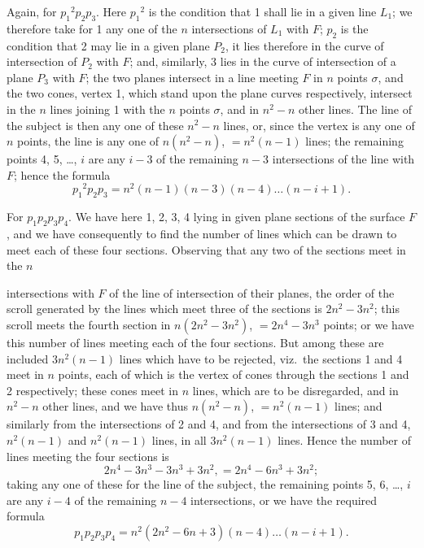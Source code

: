 \documentclass[11pt,a4paper,english]{article}
\theoremstyle{plain}
\begin{document}
Again, for ${p_1}^2p_2p_3$. Here ${p_1}^2$ is the condition that 1 shall lie in a given line $L_1$; we therefore take for 1 any one of the $n$ intersections of $L_1$ with $F$; $p_2$ is the condition that 2 may lie in a given plane $P_2$, it lies therefore in the curve of intersection of $P_2$ with $F$; and, similarly, 3 lies in the curve of intersection of a plane $P_3$ with $F$; the two planes intersect in a line meeting $F$ in $n$ points $\sigma$, and the two cones, vertex 1, which stand upon the plane curves respectively, intersect in the $n$ lines joining 1 with the $n$ points $\sigma$, and in $n^2 - n$ other lines. The line of the subject is then any one of these $n^2 - n$ lines, or, since the vertex is any one of $n$ points, the line is any one of $n(n^2 - n)$, $= n^2(n-1)$ lines; the remaining points 4, 5, \ldots, $i$ are any $i-3$ of the remaining $n-3$ intersections of the line with $F$; hence the formula
\[
{p_1}^2p_2p_3 = n^2(n-1)(n-3)(n-4)\ldots(n-i+1).
\]

For $p_1p_2p_3p_4$. We have here 1, 2, 3, 4 lying in given plane sections of the surface $F$, and we have consequently to find the number of lines which can be drawn to meet each of these four sections. Observing that any two of the sections meet in the $n$

\newpage
\noindent intersections with $F$ of the line of intersection of their planes, the order of the scroll generated by the lines which meet three of the sections is $2n^2 - 3n^2$; this scroll meets the fourth section in $n(2n^2 - 3n^2)$, $= 2n^4 - 3n^3$ points; or we have this number of lines meeting each of the four sections. But among these are included $3n^2(n-1)$ lines which have to be rejected, viz.\ the sections 1 and 4 meet in $n$ points, each of which is the vertex of cones through the sections 1 and 2 respectively; these cones meet in $n$ lines, which are to be disregarded, and in $n^2 - n$ other lines, and we have thus $n(n^2 - n)$, $= n^2(n-1)$ lines; and similarly from the intersections of 2 and 4, and from the intersections of 3 and 4, $n^2(n-1)$ and $n^2(n-1)$ lines, in all $3n^2(n-1)$ lines. Hence the number of lines meeting the four sections is
\[
2n^4 - 3n^3 - 3n^3 + 3n^2, = 2n^4 - 6n^3 + 3n^2;
\]
taking any one of these for the line of the subject, the remaining points 5, 6, \ldots, $i$ are any $i-4$ of the remaining $n-4$ intersections, or we have the required formula
\[
p_1p_2p_3p_4 = n^2(2n^2 - 6n + 3)(n-4)\ldots(n-i+1).
\]
\end{document}
